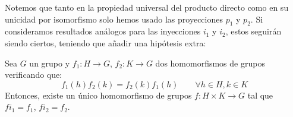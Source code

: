 \noindent
Notemos que tanto en la propiedad universal del producto directo como en su unicidad por isomorfismo solo hemos usado las proyecciones $p_1$ y $p_2$. Si consideramos resultados análogos para las inyecciones $i_1$ y $i_2$, estos seguirán siendo ciertos, teniendo que añadir una hipótesis extra:

\begin{teo}
    Sea $G$ un grupo y $f_1:H\to G$, $f_2:K\to G$ dos homomorfismos de grupos verificando que:
    \begin{equation*}
        f_1(h)f_2(k) = f_2(k)f_1(h) \qquad \forall h\in H, k\in K
    \end{equation*}
    Entonces, existe un único homomorfismo de grupos $f:H\times K\to G$ tal que $fi_1 = f_1$, $fi_2 = f_2$.

    \begin{figure}[H]
        \centering
    \end{figure}


\end{teo}

